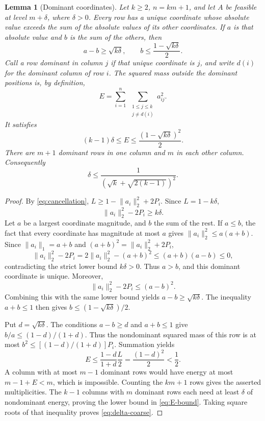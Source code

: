 \documentclass[11pt]{article}
\numberwithin{equation}{section}
\newtheorem{lemma}[lemma]{Lemma}
\theoremstyle{definition}
\theoremstyle{definition}
\newcommand{\norm}[1]{\lVert#1\rVert}
\begin{document}
\begin{lemma}[Dominant coordinates]\label{lem:dominance}
Let $k\ge2$, $n=km+1$, and let $A$ be feasible at level $m+\delta$,
where $\delta>0$. Every row has a unique coordinate whose absolute value
exceeds the sum of the absolute values of its other coordinates.
If $a$ is that absolute value and $b$ is the sum of the others, then
\[
 a-b\ge\sqrt{k\delta},\qquad
 b\le\frac{1-\sqrt{k\delta}}2.
\]
Call a row \emph{dominant in column $j$} if that unique coordinate
is $j$, and write $d(i)$ for the dominant column of row $i$.
The squared mass outside the dominant positions is, by definition,
\[
 E=\sum_{i=1}^n\ \sum_{\substack{1\le j\le k\\j\ne d(i)}}a_{ij}^2.
\]
It satisfies
\begin{equation}\label{eq:E-bound}
 (k-1)\delta\le E\le\frac{(1-\sqrt{k\delta})^2}{2}.
\end{equation}
There are $m+1$ dominant rows in one column and $m$ in each other column.
Consequently
\begin{equation}\label{eq:delta-coarse}
 \delta\le\frac1{(\sqrt{k}+\sqrt{2(k-1)})^2}.
\end{equation}
\end{lemma}
\begin{proof}
By \eqref{eq:cancellation},
$L\ge1-\norm{a_i}_2^2+2P_i$. Since $L=1-k\delta$,
\[
 \norm{a_i}_2^2-2P_i\ge k\delta.
\]
Let $a$ be a largest coordinate magnitude, and $b$ the sum of the rest.
If $a\le b$, the fact that every coordinate has magnitude at most $a$
gives $\norm{a_i}_2^2\le a(a+b)$.  Since
$\norm{a_i}_1=a+b$ and $(a+b)^2=\norm{a_i}_2^2+2P_i$,
\[
 \norm{a_i}_2^2-2P_i
 =2\norm{a_i}_2^2-(a+b)^2
 \le(a+b)(a-b)\le0,
\]
contradicting the strict lower bound $k\delta>0$.
Thus $a>b$, and this dominant coordinate is unique.  Moreover,
\[
 \norm{a_i}_2^2-2P_i\le(a-b)^2.
\]
Combining this with the same lower bound yields
$a-b\ge\sqrt{k\delta}$.  The inequality $a+b\le1$ then gives
$b\le(1-\sqrt{k\delta})/2$.

Put $d=\sqrt{k\delta}$. The conditions $a-b\ge d$ and $a+b\le1$
give $b/a\le(1-d)/(1+d)$. Thus the nondominant squared mass of this row
is at most $b^2\le[(1-d)/(1+d)]P_i$. Summation yields
\[
 E\le\frac{1-d}{1+d}\frac{L}{2}=\frac{(1-d)^2}{2}<\frac12.
\]
A column with at most $m-1$ dominant rows would have energy at most
$m-1+E<m$, which is impossible. Counting the $km+1$ rows gives the
asserted multiplicities. The $k-1$ columns with $m$ dominant rows each need at least
$\delta$ of nondominant energy, proving the lower bound in
\eqref{eq:E-bound}. Taking square roots of that inequality proves
\eqref{eq:delta-coarse}.
\end{proof}
\end{document}
